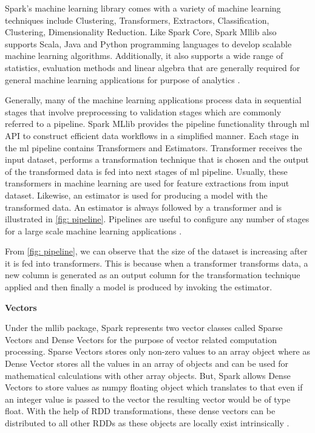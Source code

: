 \par Spark's machine learning library comes with a variety of machine learning techniques include  Clustering, Transformers, Extractors, Classification, Clustering, Dimensionality Reduction. Like Spark Core, Spark Mllib also supports Scala, Java and Python programming languages to develop scalable machine learning algorithms. Additionally, it also supports a wide range of statistics, evaluation methods and linear algebra that are generally required for general machine learning applications for purpose of analytics \cite{meng2016mllib}.



\par Generally, many of the machine learning applications process data in sequential stages that involve preprocessing to validation stages which are commonly referred to a pipeline. Spark MLlib provides the pipeline functionality through ml API to construct efficient data workflows in a simplified manner. Each stage in the ml pipeline contains Transformers and Estimators. Transformer receives the input dataset, performs a transformation technique that is chosen and the output of the transformed data is fed into next stages of ml pipeline. Usually, these transformers in machine learning are used for feature extractions from input dataset. Likewise, an estimator is used for producing a model with the transformed data. An estimator is always followed by a transformer and is illustrated in \ref{fig: pipeline}. Pipelines are useful to configure any number of stages for a large scale machine learning applications \cite{website:databricks}. 

\par From \ref{fig: pipeline}, we can observe that the size of the dataset is increasing after it is fed into transformers. This is because when a transformer transforms data, a new column is generated as an output column for the transformation technique applied and then finally a model is produced by invoking the estimator.


\textbf{Vectors}

\par Under the mllib package, Spark represents two vector classes called Sparse Vectors and Dense Vectors for the purpose of vector related computation processing. Sparse Vectors stores only non-zero values to an array object where as Dense Vector stores all the values in an array of objects and can be used for mathematical calculations with other array objects. But, Spark allows Dense Vectors to store values as numpy floating object which translates to that even if an integer value is passed to the vector the resulting vector would be of type float. With the help of RDD transformations, these dense vectors can be distributed to all other RDDs as these objects are locally exist intrinsically \cite{website:densevectors} \cite{website:documentation}.



